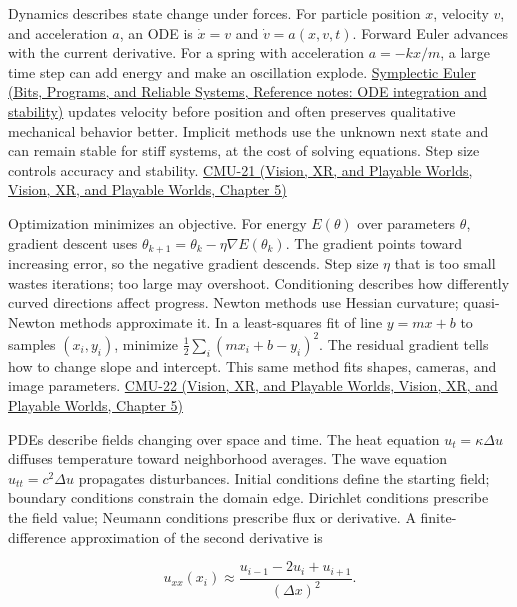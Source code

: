 Dynamics describes state change under forces. For particle position \(x\), velocity \(v\), and acceleration \(a\), an ODE is \(\dot x=v\) and \(\dot v=a(x,v,t)\). Forward Euler advances with the current derivative. For a spring with acceleration \(a=-kx/m\), a large time step can add energy and make an oscillation explode. \href{../01-Bits-Programs-and-Reliable-Systems/main.pdf\#nameddest=appendix-18eacf61a04b}{Symplectic Euler (Bits, Programs, and Reliable Systems, Reference notes: ODE integration and stability)} updates velocity before position and often preserves qualitative mechanical behavior better. Implicit methods use the unknown next state and can remain stable for stiff systems, at the cost of solving equations. Step size controls accuracy and stability. \href{../07-Vision-XR-and-Playable-Worlds/main.pdf\#nameddest=04-visual-computing-ii-ch036-cmu-21---dynamics-and-time-integration}{CMU-21 (Vision, XR, and Playable Worlds, Vision, XR, and Playable Worlds, Chapter 5)}

Optimization minimizes an objective. For energy \(E(\theta)\) over parameters \(\theta\), gradient descent uses \(\theta_{k+1}=\theta_k-\eta\nabla E(\theta_k)\). The gradient points toward increasing error, so the negative gradient descends. Step size \(\eta\) that is too small wastes iterations; too large may overshoot. Conditioning describes how differently curved directions affect progress. Newton methods use Hessian curvature; quasi-Newton methods approximate it. In a least-squares fit of line \(y=mx+b\) to samples \((x_i,y_i)\), minimize \(\tfrac12\sum_i(mx_i+b-y_i)^2\). The residual gradient tells how to change slope and intercept. This same method fits shapes, cameras, and image parameters. \href{../07-Vision-XR-and-Playable-Worlds/main.pdf\#nameddest=04-visual-computing-ii-ch036-cmu-22---optimization}{CMU-22 (Vision, XR, and Playable Worlds, Vision, XR, and Playable Worlds, Chapter 5)}

PDEs describe fields changing over space and time. The heat equation \(u_t=\kappa\Delta u\) diffuses temperature toward neighborhood averages. The wave equation \(u_{tt}=c^2\Delta u\) propagates disturbances. Initial conditions define the starting field; boundary conditions constrain the domain edge. Dirichlet conditions prescribe the field value; Neumann conditions prescribe flux or derivative. A finite-difference approximation of the second derivative is

\[
u_{xx}(x_i)\approx\frac{u_{i-1}-2u_i+u_{i+1}}{(\Delta x)^2}.
\]

